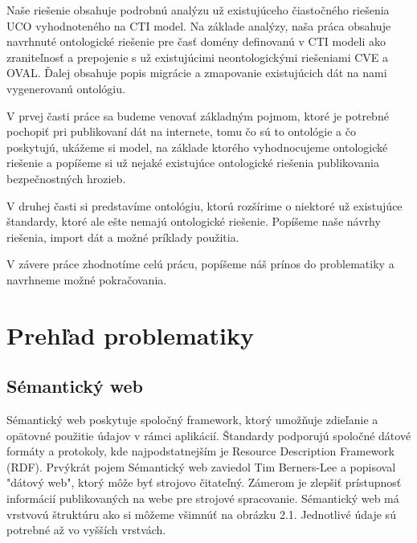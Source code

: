 \documentclass[12pt, a4paper, oneside]{book}
\begin{document}

Naše riešenie obsahuje podrobnú analýzu už existujúceho čiastočného riešenia UCO vyhodnoteného na CTI model. Na základe analýzy, naša práca obsahuje navrhnuté ontologické riešenie pre časť domény definovanú v CTI modeli ako zraniteľnosť a prepojenie s už existujúcimi neontologickými riešeniami CVE a OVAL. Ďalej obsahuje popis migrácie a zmapovanie existujúcich dát na nami vygenerovanú ontológiu.


V prvej časti práce sa budeme venovať základným pojmom, ktoré je potrebné pochopiť pri publikovaní dát na internete, tomu čo sú to ontológie a čo poskytujú, ukážeme si model, na základe ktorého vyhodnocujeme ontologické riešenie a popíšeme si už nejaké existujúce ontologické riešenia publikovania bezpečnostných hrozieb.


V druhej časti si predstavíme ontológiu, ktorú rozšírime o niektoré už existujúce štandardy, ktoré ale ešte nemajú ontologické riešenie. Popíšeme naše návrhy riešenia, import dát a možné príklady použitia.


V závere práce zhodnotíme celú prácu, popíšeme náš prínos do problematiky a navrhneme možné pokračovania.




\part{Prehľad problematiky}
\chapter{Sémantický web}
Sémantický web \cite{semantic} poskytuje spoločný framework, ktorý umožňuje zdieľanie a opätovné použitie údajov v rámci aplikácií. Štandardy podporujú spoločné dátové formáty a protokoly, kde najpodstatnejším je Resource Description Framework (RDF). Prvýkrát pojem Sémantický web zaviedol Tim Berners-Lee a popisoval "dátový web", ktorý môže byť strojovo čitateľný. Zámerom je zlepšiť prístupnosť informácií publikovaných na webe pre strojové spracovanie. Sémantický web má vrstvovú štruktúru ako si môžeme všimnúť na obrázku 2.1. Jednotlivé údaje sú potrebné až vo vyšších vrstvách. 
\end{document}
